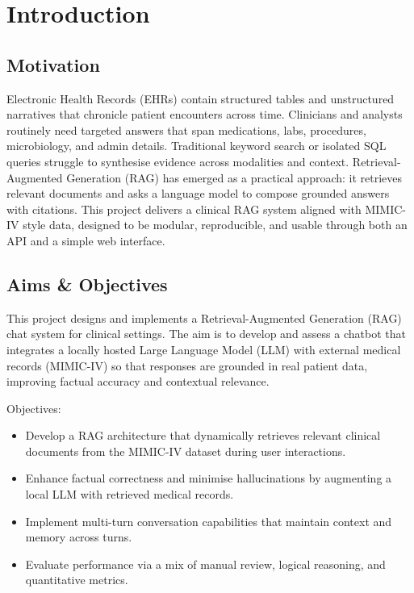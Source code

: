 \chapter{Introduction}

\section{Motivation}
Electronic Health Records (EHRs) contain structured tables and unstructured \mbox{narratives} that chronicle patient encounters across time. Clinicians and analysts routinely need \mbox{targeted} answers that span medications, labs, procedures, microbiology, and admin details. Traditional keyword search or isolated SQL queries struggle to synthesise evidence across modalities and context. Retrieval-Augmented Generation (RAG) has emerged as a practical approach: it retrieves relevant documents and asks a language model to compose grounded answers with citations. This project delivers a clinical RAG system aligned with MIMIC-IV style data, designed to be modular, reproducible, and usable through both an API and a simple web interface.

\section{Aims \& Objectives}
This project designs and implements a Retrieval-Augmented Generation (RAG) chat system for clinical settings. The aim is to develop and assess a chatbot that integrates a locally hosted Large Language Model (LLM) with external medical records \mbox{(MIMIC-IV)} so that responses are grounded in real patient data, improving factual accuracy and contextual relevance.

\noindent Objectives:
\begin{itemize}
  \item Develop a RAG architecture that dynamically retrieves relevant clinical documents from the MIMIC-IV dataset during user interactions.
  \item Enhance factual correctness and minimise hallucinations by augmenting a local LLM with retrieved medical records.
  \item Implement multi-turn conversation capabilities that maintain context and memory across turns.
  \item Evaluate performance via a mix of manual review, logical reasoning, and quantitative metrics.
\end{itemize}

